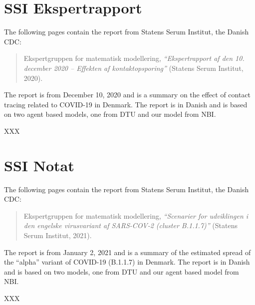 
\chapter{SSI Ekspertrapport}
\label{appendix:ssi-report}

The following pages contain the report from Statens Serum Institut, the Danish CDC:
\begin{quote}
    Ekspertgruppen for matematisk modellering, \emph{``Ekspertrapport af den 10. december 2020 -- Effekten af kontaktopsporing''} (Statens Serum Institut, 2020).
\end{quote}
The report is from December 10, 2020 and is a summary on the effect of contact tracing related to COVID-19 in Denmark. The report is in Danish and is based on two agent based models, one from DTU and our model from NBI.

\clearpage
% 
% 
XXX



\chapter{SSI Notat}
\label{appendix:ssi-notat}

The following pages contain the report from Statens Serum Institut, the Danish CDC:
\begin{quote}
    Ekspertgruppen for matematisk modellering, \emph{``Scenarier for udviklingen i den engelske virusvariant af SARS-COV-2 (cluster B.1.1.7)''} (Statens Serum Institut, 2021).
\end{quote}
The report is from January 2, 2021 and is a summary of the estimated spread of the ``alpha'' variant of COVID-19 (B.1.1.7) in Denmark. The report is in Danish and is based on two models, one from DTU and our agent based model from NBI.

\clearpage
% 
XXX


